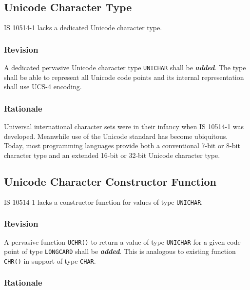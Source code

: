\documentclass[10pt,a4paper,leqno,fleqn]{article}
\renewcommand{\emph}[1]{\textbf{\textit{#1}}}
\begin{document}
\subsection{Unicode Character Type}

IS 10514-1 lacks a dedicated Unicode character type.

\subsubsection{Revision}

A dedicated pervasive Unicode character type \texttt{UNICHAR} shall be
\emph{added}. The type shall be able to represent all Unicode code points
and its internal representation shall use UCS-4 encoding.

\subsubsection{Rationale}

Universal international character sets were in their infancy when IS 10514-1 was
developed. Meanwhile use of the Unicode standard \cite{Unicode2019} has become
ubiquitous. Today, most programming languages provide both a conventional 7-bit
or 8-bit character type and an extended 16-bit or 32-bit Unicode character type.


\subsection{Unicode Character Constructor Function}

IS 10514-1 lacks a constructor function for values of type \texttt{UNICHAR}.

\subsubsection{Revision}

A pervasive function \texttt{UCHR()} to return a value of type \texttt{UNICHAR}
for a given code point of type \texttt{LONGCARD} shall be \emph{added}.
This is analogous to existing function \texttt{CHR()} in support of type
\texttt{CHAR}.

\subsubsection{Rationale}
\end{document}
